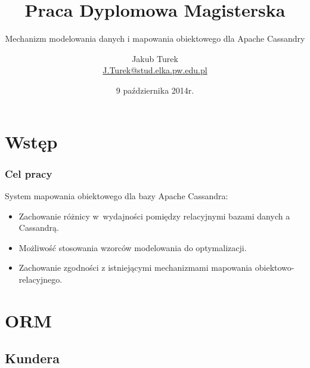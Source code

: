 \documentclass{beamer}
\title[Mechanizm modelowania danych i mapowania obiektowego dla Apache Cassandry]{Praca Dyplomowa Magisterska}
\subtitle{Mechanizm modelowania danych i mapowania obiektowego dla Apache Cassandry}
\author[Jakub Turek]{Jakub Turek \\ {\small \href{mailto:J.Turek@stud.elka.pw.edu.pl}{J.Turek@stud.elka.pw.edu.pl}}}
\date{9 października 2014r.}
\begin{document}
	\begin{frame}
		\titlepage
	\end{frame}

	\section{Wstęp}

	\begin{frame}
		\frametitle{Cel pracy}

		System mapowania obiektowego dla bazy Apache Cassandra:

		\begin{itemize}
			\item Zachowanie różnicy w~wydajności pomiędzy relacyjnymi bazami danych a Cassandrą.
			\item Możliwość stosowania wzorców modelowania do optymalizacji.
			\item Zachowanie zgodności z istniejącymi mechanizmami mapowania obiektowo-relacyjnego.
		\end{itemize}
	\end{frame}

	\section{ORM}
	\subsection{Kundera}
\end{document}
